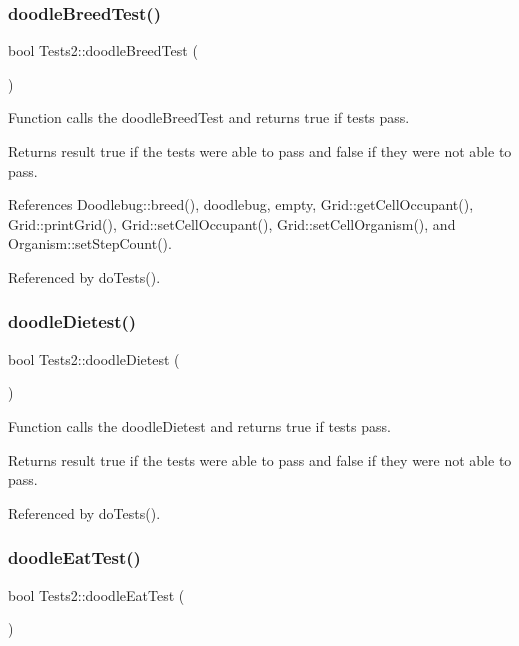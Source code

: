 \subsubsection{doodle\+Breed\+Test()}
{\footnotesize\ttfamily bool Tests2\+::doodle\+Breed\+Test (\begin{DoxyParamCaption}{ }\end{DoxyParamCaption})}

Function calls the doodle\+Breed\+Test and returns true if tests pass.

\begin{DoxyReturn}{Returns}
result true if the tests were able to pass and false if they were not able to pass. 
\end{DoxyReturn}


References Doodlebug\+::breed(), doodlebug, empty, Grid\+::get\+Cell\+Occupant(), Grid\+::print\+Grid(), Grid\+::set\+Cell\+Occupant(), Grid\+::set\+Cell\+Organism(), and Organism\+::set\+Step\+Count().



Referenced by do\+Tests().

\mbox{\label{classTests2_aaf403f9bb7338771173e2053ea4f95fc}} 
\subsubsection{doodle\+Dietest()}
{\footnotesize\ttfamily bool Tests2\+::doodle\+Dietest (\begin{DoxyParamCaption}{ }\end{DoxyParamCaption})}

Function calls the doodle\+Dietest and returns true if tests pass.

\begin{DoxyReturn}{Returns}
result true if the tests were able to pass and false if they were not able to pass. 
\end{DoxyReturn}


Referenced by do\+Tests().

\mbox{\label{classTests2_ae35f30e7d95e581cc4ce1316409c71ac}} 
\subsubsection{doodle\+Eat\+Test()}
{\footnotesize\ttfamily bool Tests2\+::doodle\+Eat\+Test (\begin{DoxyParamCaption}{ }\end{DoxyParamCaption})}

